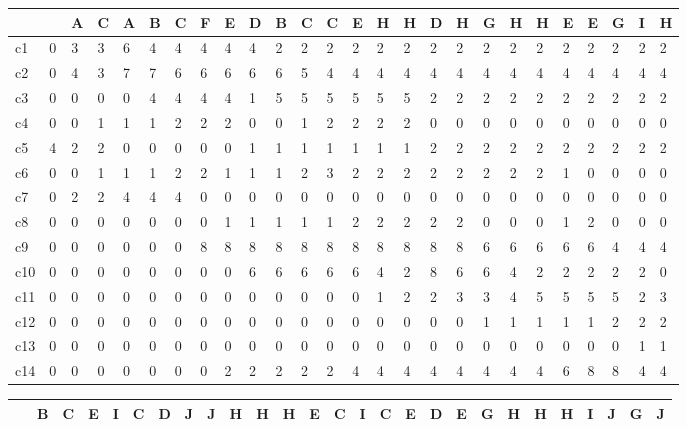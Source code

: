 \documentclass{article}
\begin{document}
\begin{table}[H]
  \centering \tiny

  \begin{tabular}{|l|lllllllllllllllllllllllll|}
    \hline
~  & ~ & A & C & A & B & C & F & E & D & B & C & C & E & H & H & D & H & G & H & H & E & E & G & I & H \\ \hline
c1  & 0 & 3 & 3 & 6 & 4 & 4 & 4 & 4 & 4 & 2 & 2 & 2 & 2 & 2 & 2 & 2 & 2 & 2 & 2 & 2 & 2 & 2 & 2 & 2 & 2 \\
c2  & 0 & 4 & 3 & 7 & 7 & 6 & 6 & 6 & 6 & 6 & 5 & 4 & 4 & 4 & 4 & 4 & 4 & 4 & 4 & 4 & 4 & 4 & 4 & 4 & 4 \\
c3  & 0 & 0 & 0 & 0 & 4 & 4 & 4 & 4 & 1 & 5 & 5 & 5 & 5 & 5 & 5 & 2 & 2 & 2 & 2 & 2 & 2 & 2 & 2 & 2 & 2 \\
c4  & 0 & 0 & 1 & 1 & 1 & 2 & 2 & 2 & 0 & 0 & 1 & 2 & 2 & 2 & 2 & 0 & 0 & 0 & 0 & 0 & 0 & 0 & 0 & 0 & 0 \\
c5  & 4 & 2 & 2 & 0 & 0 & 0 & 0 & 0 & 1 & 1 & 1 & 1 & 1 & 1 & 1 & 2 & 2 & 2 & 2 & 2 & 2 & 2 & 2 & 2 & 2 \\
c6  & 0 & 0 & 1 & 1 & 1 & 2 & 2 & 1 & 1 & 1 & 2 & 3 & 2 & 2 & 2 & 2 & 2 & 2 & 2 & 2 & 1 & 0 & 0 & 0 & 0 \\
c7  & 0 & 2 & 2 & 4 & 4 & 4 & 0 & 0 & 0 & 0 & 0 & 0 & 0 & 0 & 0 & 0 & 0 & 0 & 0 & 0 & 0 & 0 & 0 & 0 & 0 \\
c8  & 0 & 0 & 0 & 0 & 0 & 0 & 0 & 1 & 1 & 1 & 1 & 1 & 2 & 2 & 2 & 2 & 2 & 0 & 0 & 0 & 1 & 2 & 0 & 0 & 0 \\
c9  & 0 & 0 & 0 & 0 & 0 & 0 & 8 & 8 & 8 & 8 & 8 & 8 & 8 & 8 & 8 & 8 & 8 & 6 & 6 & 6 & 6 & 6 & 4 & 4 & 4 \\
c10 & 0 & 0 & 0 & 0 & 0 & 0 & 0 & 0 & 6 & 6 & 6 & 6 & 6 & 4 & 2 & 8 & 6 & 6 & 4 & 2 & 2 & 2 & 2 & 2 & 0 \\
c11 & 0 & 0 & 0 & 0 & 0 & 0 & 0 & 0 & 0 & 0 & 0 & 0 & 0 & 1 & 2 & 2 & 3 & 3 & 4 & 5 & 5 & 5 & 5 & 2 & 3 \\
c12 & 0 & 0 & 0 & 0 & 0 & 0 & 0 & 0 & 0 & 0 & 0 & 0 & 0 & 0 & 0 & 0 & 0 & 1 & 1 & 1 & 1 & 1 & 2 & 2 & 2 \\
c13 & 0 & 0 & 0 & 0 & 0 & 0 & 0 & 0 & 0 & 0 & 0 & 0 & 0 & 0 & 0 & 0 & 0 & 0 & 0 & 0 & 0 & 0 & 0 & 1 & 1 \\
c14 & 0 & 0 & 0 & 0 & 0 & 0 & 0 & 2 & 2 & 2 & 2 & 2 & 4 & 4 & 4 & 4 & 4 & 4 & 4 & 4 & 6 & 8 & 8 & 4 & 4 \\ \hline 
\end{tabular}
  \begin{tabular}{|l|llllllllllllllllllllllllll|}
    \hline
~   & B & C & E & I & C & D & J & J & H & H & H & E & C & I & C & E & D & E & G & H & H & H & I & J & G & J \\ \hline

\end{tabular}
\end{table}
\end{document}
